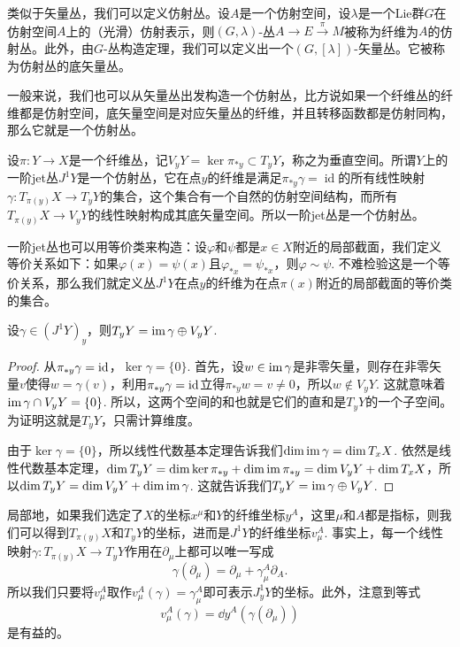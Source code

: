\begin{para}[仿射丛]
    类似于矢量丛，我们可以定义仿射丛。设$A$是一个仿射空间，设$\lambda$是一个Lie群$G$在仿射空间$A$上的（光滑）仿射表示，则$(G,\lambda)$-丛$A\to E\xrightarrow{\pi} M$被称为纤维为$A$的仿射丛。此外，由$G$-丛构造定理，我们可以定义出一个$(G,[\lambda])$-矢量丛。它被称为仿射丛的底矢量丛。
\end{para}

一般来说，我们也可以从矢量丛出发构造一个仿射丛，比方说如果一个纤维丛的纤维都是仿射空间，底矢量空间是对应矢量丛的纤维，并且转移函数都是仿射同构，那么它就是一个仿射丛。

\begin{para}[一阶jet丛]
    设$\pi:Y\to X$是一个纤维丛，记$V_yY=\ker\pi_{*y}\subset T_yY$，称之为垂直空间。所谓$Y$上的一阶jet丛$J^1Y$是一个仿射丛，它在点$y$的纤维是满足$\pi_{*y}\gamma=\operatorname{id}$的所有线性映射$\gamma:T_{\pi(y)}X\to T_yY$的集合，这个集合有一个自然的仿射空间结构，而所有$T_{\pi(y)}X\to V_yY$的线性映射构成其底矢量空间。所以一阶jet丛是一个仿射丛。

    一阶jet丛也可以用等价类来构造：设$\varphi$和$\psi$都是$x\in X$附近的局部截面，我们定义等价关系如下：如果$\varphi(x)=\psi(x)$且$\varphi_{*x}=\psi_{*x}$，则$\varphi\sim \psi$. 不难检验这是一个等价关系，那么我们就定义丛$J^1Y$在点$y$的纤维为在点$\pi(x)$附近的局部截面的等价类的集合。
\end{para}

\begin{lem}
    设$\gamma\in (J^1Y)_y$，则$T_yY=\operatorname{im}\gamma\oplus V_yY$.
\end{lem}

\begin{proof}
    从$\pi_{*y}\gamma=\operatorname{id}$，$\ker \gamma=\{0\}$. 首先，设$w\in \operatorname{im}\gamma$是非零矢量，则存在非零矢量$v$使得$w=\gamma(v)$，利用$\pi_{*y}\gamma=\operatorname{id}$立得$\pi_{*y}w=v\neq 0$，所以$w\not\in  V_yY$. 这就意味着$\operatorname{im}\gamma\cap V_yY=\{0\}$. 所以，这两个空间的和也就是它们的直和是$T_yY$的一个子空间。为证明这就是$T_yY$，只需计算维度。

    由于$\ker \gamma=\{0\}$，所以线性代数基本定理告诉我们$\dim \operatorname{im}\gamma=\dim T_xX$. 依然是线性代数基本定理，$\dim T_yY=\dim \ker \pi_{*y}+\dim \operatorname{im} \pi_{*y}=\dim V_yY+\dim T_xX$，所以$\dim T_yY=\dim V_yY+\dim \operatorname{im}\gamma$. 这就告诉我们$T_yY=\operatorname{im}\gamma\oplus V_yY$.
\end{proof}

局部地，如果我们选定了$X$的坐标$x^\mu$和$Y$的纤维坐标$y^A$，这里$\mu$和$A$都是指标，则我们可以得到$T_{\pi(y)}X$和$T_yY$的坐标，进而是$J^1Y$的纤维坐标$v^{A}_\mu$. 事实上，每一个线性映射$\gamma:T_{\pi(y)}X\to T_yY$作用在$\partial_\mu$上都可以唯一写成
\[
    \gamma(\partial_\mu)=\partial_\mu+\gamma^A_{\mu}\partial_A.
\]
所以我们只要将$v^{A}_\mu$取作$v^A_\mu(\gamma)=\gamma^A_{\mu}$即可表示$J^1_y Y$的坐标。此外，注意到等式
\begin{equation}
    v^A_\mu(\gamma)=\dd y^A(\gamma(\partial_\mu))    
\end{equation}
是有益的。

